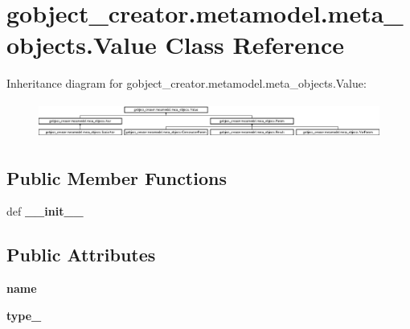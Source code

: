 \hypertarget{classgobject__creator_1_1metamodel_1_1meta__objects_1_1Value}{
\section{gobject\_\-creator.metamodel.meta\_\-objects.Value Class Reference}
\label{classgobject__creator_1_1metamodel_1_1meta__objects_1_1Value}
}
Inheritance diagram for gobject\_\-creator.metamodel.meta\_\-objects.Value:\begin{figure}[H]
\begin{center}
\leavevmode
\includegraphics[height=1.1831cm]{classgobject__creator_1_1metamodel_1_1meta__objects_1_1Value}
\end{center}
\end{figure}
\subsection*{Public Member Functions}
\begin{DoxyCompactItemize}
\item 
\hypertarget{classgobject__creator_1_1metamodel_1_1meta__objects_1_1Value_a9671f8290a5fead84a257ca0504d7aab}{
def {\bfseries \_\-\_\-init\_\-\_\-}}
\label{classgobject__creator_1_1metamodel_1_1meta__objects_1_1Value_a9671f8290a5fead84a257ca0504d7aab}

\end{DoxyCompactItemize}
\subsection*{Public Attributes}
\begin{DoxyCompactItemize}
\item 
\hypertarget{classgobject__creator_1_1metamodel_1_1meta__objects_1_1Value_ad59b5dfdb166b54901b65af5906de624}{
{\bfseries name}}
\label{classgobject__creator_1_1metamodel_1_1meta__objects_1_1Value_ad59b5dfdb166b54901b65af5906de624}

\item 
\hypertarget{classgobject__creator_1_1metamodel_1_1meta__objects_1_1Value_a5758596b39013705a2fd36f7fa8f6833}{
{\bfseries type\_\-}}
\label{classgobject__creator_1_1metamodel_1_1meta__objects_1_1Value_a5758596b39013705a2fd36f7fa8f6833}

\end{DoxyCompactItemize}
